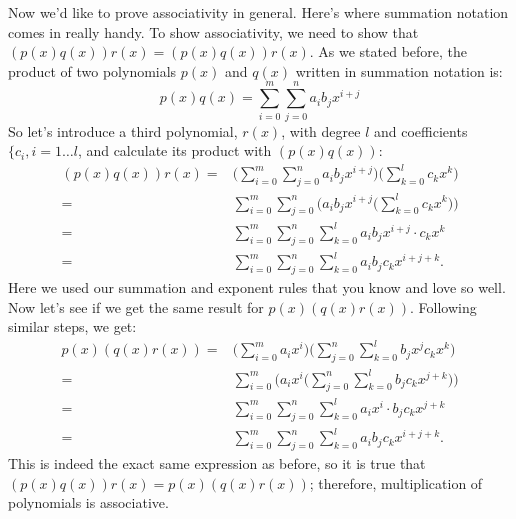 Now we'd like to prove associativity in general. Here's where summation notation comes in really handy. To show associativity, we need to show that $(p(x)q(x))r(x)=(p(x)q(x))r(x)$.  As we stated before, the product of two polynomials $p(x)$ and $q(x)$ written in summation notation is:
\[
p(x) q(x) =\sum_{i=0}^{m}\sum_{j=0}^{n}a_i b_j x^{i+j}
\]
So let's introduce a third polynomial, $r(x)$, with degree $l$ and coefficients $\{ c_i, i=1 \ldots l$, and calculate its product with $(p(x)q(x))$:
\begin{align*}
(p(x) q(x))r(x) =&  \Big( \sum_{i=0}^{m}\sum_{j=0}^{n}a_i b_j x^{i+j} \Big)\Big(\sum_{k=0}^{l} c_k x^k \Big)  \\
=&   \sum_{i=0}^{m}\sum_{j=0}^{n} \Big(a_i b_j x^{i+j}\Big(\sum_{k=0}^{l} c_k x^k \Big) \Big)  \\
=& \sum_{i=0}^{m}\sum_{j=0}^{n}\sum_{k=0}^{l} a_i b_j x^{i+j} \cdot c_k x^k \\
=&  \sum_{i=0}^{m}\sum_{j=0}^{n}\sum_{k=0}^{l} a_i b_j  c_k x^{i+j+k}. 
\end{align*}
Here we used our summation and exponent rules that you know and love so well.  Now let's see if we get the same result for $p(x)  (q(x)r(x))$. Following similar steps, we get:
\begin{align*}
p(x)  (q(x)r(x)) =& \Big(\sum_{i=0}^{m} a_ix^i \Big) \Big( \sum_{j=0}^{n} \sum_{k=0}^{l}  b_j x^j c_k  x^k \Big)    \\
=& \sum_{i=0}^{m} \Bigg( a_i x^i \Big(\sum_{j=0}^{n} \sum_{k=0}^{l}   b_j c_k x^{j+k} \Big) \Bigg)\\
=&   \sum_{i=0}^{m}\sum_{j=0}^{n}\sum_{k=0}^{l}   a_i x^i \cdot b_j c_k x^{j+k}\\
=&  \sum_{i=0}^{m}\sum_{j=0}^{n} \sum_{k=0}^{l} a_i b_j  c_k x^{i+j+k}. 
\end{align*}
This  is indeed the exact same expression as before, so it is true that $(p(x)q(x))r(x)=p(x)(q(x)r(x))$; therefore, multiplication of polynomials is associative. 
